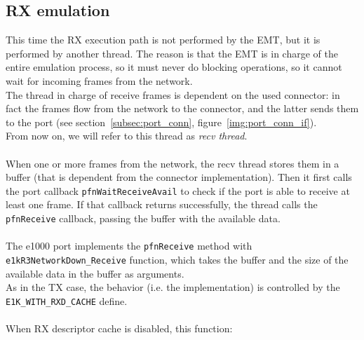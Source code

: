 \documentclass[a4paper, 12pt, titlepage]{report}
\begin{document}
\subsection{RX emulation} \label{subsec:rx_emulation}
This time the RX execution path is not performed by the EMT, but it is performed by another thread. The reason is that the EMT is in charge of the entire emulation process, so it must never do blocking operations, so it cannot wait for incoming frames from the network.
\\
The thread in charge of receive frames is dependent on the used connector: in fact the frames flow from the network to the connector, and the latter sends them to the port (see section~\ref{subsec:port_conn}, figure~\ref{img:port_conn_if}).
\\
From now on, we will refer to this thread as \textit{recv thread}.
\\
\\
When one or more frames from the network, the recv thread stores them in a buffer (that is dependent from the connector implementation). Then it first calls the port callback \texttt{pfnWaitReceiveAvail} to check if the port is able to receive at least one frame. If that callback returns successfully, the thread calls the \texttt{pfnReceive} callback, passing the buffer with the available data.
\\
\\
The e1000 port implements the \texttt{pfnReceive} method with \texttt{e1kR3NetworkDown\_Receive} function, which takes the buffer and the size of the available data in the buffer as arguments.
\\
As in the TX case, the behavior (i.e. the implementation) is controlled by the \texttt{E1K\_WITH\_RXD\_CACHE} define.
\\
\\
When RX descriptor cache is disabled, this function:
\end{document}

